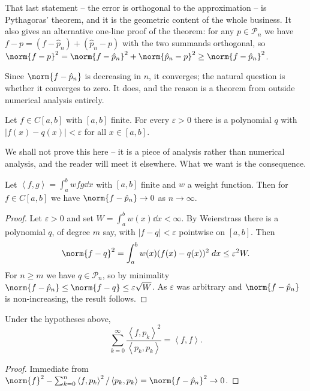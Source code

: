 \documentclass[a4paper]{scrartcl}
\providecommand{\abs}[1]{\left\lvert#1\right\rvert}
\renewcommand{\abs}[1]{\left\lvert#1\right\rvert}
\newcommand{\ip}[2]{\left\langle #1, #2 \right\rangle}
\newcommand{\Pn}[1]{\mathcal{P}_{#1}}
\begin{document}
That last statement -- the error is orthogonal to the approximation -- is Pythagoras' theorem, and it is the geometric content of the whole business. It also gives an alternative one-line proof of the theorem: for any $p \in \Pn{n}$ we have $f - p = (f - \hat p_n) + (\hat p_n - p)$ with the two summands orthogonal, so $\norm{f-p}^2 = \norm{f - \hat p_n}^2 + \norm{\hat p_n - p}^2 \geq \norm{f - \hat p_n}^2$.

Since $\norm{f - \hat p_n}$ is decreasing in $n$, it converges; the natural question is whether it converges to zero. It does, and the reason is a theorem from outside numerical analysis entirely.

\begin{theorem}
  Let $f \in C[a,b]$ with $[a,b]$ finite. For every $\varepsilon > 0$ there is a polynomial $q$ with $\abs{f(x) - q(x)} < \varepsilon$ for all $x \in [a,b]$.
\end{theorem}

We shall not prove this here -- it is a piece of analysis rather than numerical analysis, and the reader will meet it elsewhere. What we want is the consequence.

\begin{corollary}
  Let $\ip{f}{g} = \int_a^b w f g \dd x$ with $[a,b]$ finite and $w$ a weight function. Then for $f \in C[a,b]$ we have $\norm{f - \hat p_n} \to 0$ as $n \to \infty$.
\end{corollary}
\begin{proof}
  Let $\varepsilon > 0$ and set $W = \int_a^b w(x)\dd x < \infty$. By Weierstrass there is a polynomial $q$, of degree $m$ say, with $\abs{f - q} < \varepsilon$ pointwise on $[a,b]$. Then
  $$
  \norm{f - q}^2 = \int_a^b w(x)(f(x)-q(x))^2 \dd x \leq \varepsilon^2 W.
  $$
  For $n \geq m$ we have $q \in \Pn{n}$, so by minimality $\norm{f - \hat p_n} \leq \norm{f - q} \leq \varepsilon \sqrt{W}$. As $\varepsilon$ was arbitrary and $\norm{f - \hat p_n}$ is non-increasing, the result follows.
\end{proof}

\begin{corollary}
  Under the hypotheses above,
  $$
  \sum_{k=0}^\infty \frac{\ip{f}{p_k}^2}{\ip{p_k}{p_k}} = \ip{f}{f}.
  $$
\end{corollary}
\begin{proof}
  Immediate from $\norm{f}^2 - \sum_{k=0}^n \ip{f}{p_k}^2/\ip{p_k}{p_k} = \norm{f - \hat p_n}^2 \to 0$.
\end{proof}
\end{document}
